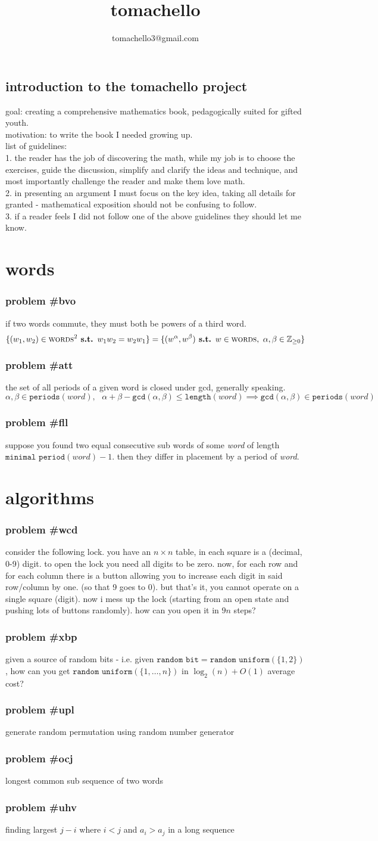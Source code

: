 \documentclass{article}
\title{tomachello}
\author{tomachello3@gmail.com}
\date{}
\newcommand{\st}{\textbf{ s.t. }}
\newcommand{\SP}{\text{ }}
\newcommand{\problem}[1]{\subsubsection*{\textbf{problem \##1}}}
\newcommand{\chapter}[1]{\section*{#1}}
\newcommand{\Zpf}{\mathbb{Z}_{\ge0}}
\newcommand{\CST}[1]{\textsc{#1}}
\newcommand{\FNC}[1]{\texttt{#1}}
\newcommand{\VAR}[1]{\textit{#1}}
\begin{document}
\maketitle

\subsection*{introduction to the tomachello project}
goal: creating a comprehensive mathematics book, pedagogically suited for gifted youth.\\
motivation: to write the book I needed growing up.\\
list of guidelines:\\
1. the reader has the job of discovering the math, while my job is to choose the exercises, guide the discussion, simplify and clarify the ideas and technique, and most importantly challenge the reader and make them love math.\\
2. in presenting an argument I must focus on the key idea, taking all details for granted - mathematical exposition should not be confusing to follow.\\
3. if a reader feels I did not follow one of the above guidelines they should let me know.
\chapter{words}
\problem{bvo} if two words commute, they must both be powers of a third word. 
$$\{(w_1,w_2)\in \CST{words}^2 \st w_1w_2=w_2w_1\}=\{(w^\alpha,w^\beta)\st w\in\CST{words},\SP\alpha,\beta\in\Zpf\}$$
\problem{att} the set of all periods of a given word is closed under gcd, generally speaking.
$$\alpha,\beta\in \FNC{periods}(\VAR{word}), \SP\alpha+\beta-\FNC{gcd}(\alpha,\beta)\le \FNC{length}(\VAR{word})\implies \FNC{gcd}(\alpha,\beta)\in\FNC{periods}(\VAR{word})$$
\problem{fll} suppose you found two equal consecutive sub words of some \VAR{word} of length $\FNC{minimal period}(\VAR{word})-1$. then they differ in placement by a period of \VAR{word}.
\chapter{algorithms}
\problem{wcd} consider the following lock. you have an $n\times n$ table, in each square is a 
(decimal, 0-9) digit. to open the lock you need all digits to be zero. now, for each row and for each column there is a button allowing you to increase each digit in said row/column by one. (so that 9 goes to 0). but that's it, you cannot operate on a single square (digit). now i mess up the lock (starting from an open state and pushing lots of buttons randomly). how can you open it in $9n$ steps?
\problem{xbp} given a source of random bits - i.e. given $\FNC{random bit}=\FNC{random uniform}(\{1,2\})$, how can you get $\FNC{random uniform}(\{1,\dots,n\})$ in $\log_2(n)+O(1)$ average cost?
\problem{upl} generate random permutation using random number generator
\problem{ocj} longest common sub sequence of two words
\problem{uhv} finding largest $j-i$ where $i<j$ and $a_i>a_j$ in a long sequence
\end{document}
